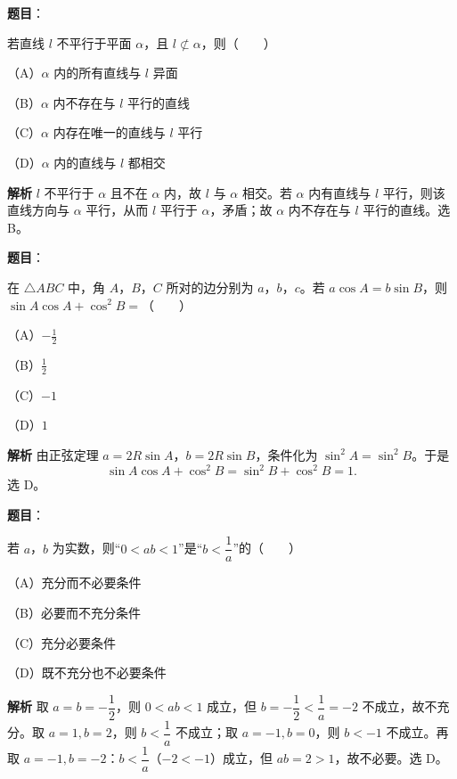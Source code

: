 \begin{answer}

\textbf{题目}：

若直线 $l$ 不平行于平面 $\alpha$，且 $l\not\subset\alpha$，则\mbox{（　　）}

（A）$\alpha$ 内的所有直线与 $l$ 异面

（B）$\alpha$ 内不存在与 $l$ 平行的直线

（C）$\alpha$ 内存在唯一的直线与 $l$ 平行

（D）$\alpha$ 内的直线与 $l$ 都相交

\textbf{解析}
$l$ 不平行于 $\alpha$ 且不在 $\alpha$ 内，故 $l$ 与 $\alpha$ 相交。若 $\alpha$ 内有直线与 $l$ 平行，则该直线方向与 $\alpha$ 平行，从而 $l$ 平行于 $\alpha$，矛盾；故 $\alpha$ 内不存在与 $l$ 平行的直线。选 B。


\end{answer}
\begin{answer}

\textbf{题目}：

在 $\triangle ABC$ 中，角 $A$，$B$，$C$ 所对的边分别为 $a$，$b$，$c$。若 $a\cos A=b\sin B$，则 $\sin A\cos A+\cos^2B=$\mbox{（　　）}

（A）$-\frac12$

（B）$\frac12$

（C）$-1$

（D）$1$

\textbf{解析}
由正弦定理 $a=2R\sin A$，$b=2R\sin B$，条件化为 $\sin^2A=\sin^2B$。于是
\nopagebreak[4]
\[\sin A\cos A+\cos^2B=\sin^2B+\cos^2B=1.\]
选 D。


\end{answer}
\begin{answer}

\textbf{题目}：

若 $a$，$b$ 为实数，则“$0<ab<1$”是“$b<\dfrac1a$”的\mbox{（　　）}

（A）充分而不必要条件

（B）必要而不充分条件

（C）充分必要条件

（D）既不充分也不必要条件

\textbf{解析}
取 $a=b=-\dfrac12$，则 $0<ab<1$ 成立，但 $b=-\dfrac12<\dfrac1a=-2$ 不成立，故不充分。取 $a=1,b=2$，则 $b<\dfrac1a$ 不成立；取 $a=-1,b=0$，则 $b< -1$ 不成立。再取 $a=-1,b=-2$：$b<\dfrac1a$（$-2<-1$）成立，但 $ab=2>1$，故不必要。选 D。


\end{answer}
